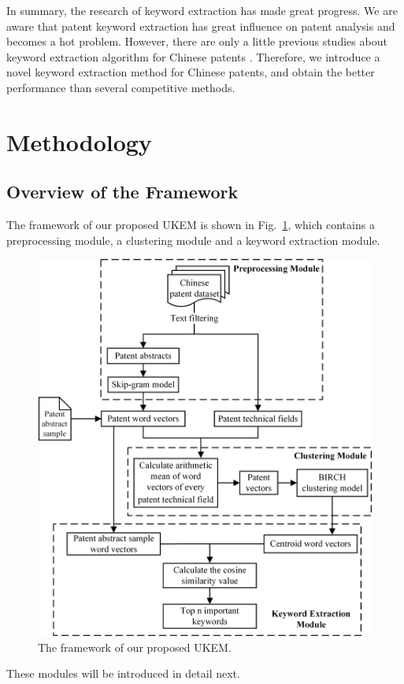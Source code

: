 \documentclass[conference]{IEEEtran}
\begin{document}
	In summary, the research of keyword extraction has made great progress. We are aware that patent keyword extraction has great influence on patent analysis and becomes a hot problem. However, there are only a little previous studies about keyword extraction algorithm for Chinese patents \cite{b22}. Therefore, we introduce a novel keyword extraction method for Chinese patents, and obtain the better performance than several competitive methods.
	\section{Methodology}
	\subsection{Overview of the Framework}
	The framework of our proposed UKEM is shown in Fig.~\ref{framework}, which contains a preprocessing module, a clustering module and a keyword extraction module. 
	\begin{figure}[ht]
		\centering
		\includegraphics[scale=0.6]{framework.jpg} 
		\caption{The framework of our proposed UKEM.}
		\label{framework}
	\end{figure}
	These modules will be introduced in detail next.
	
\end{document}

